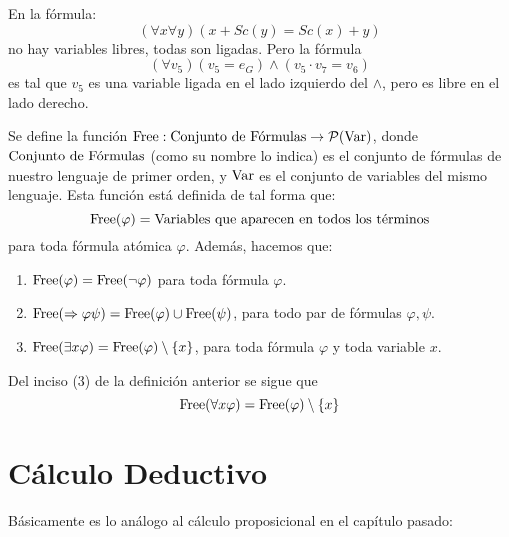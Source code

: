 \documentclass[12pt]{report}
\newcounter{it}
\theoremstyle{largebreak}
\newcommand\cf[3]{\ensuremath{#1:#2\rightarrow#3}}
\newcommand{\free}{\textup{Free}}
\begin{document}
    En la fórmula:
    \begin{equation*}
        (\forall x\forall y)(x+Sc(y)=Sc(x)+y)
    \end{equation*}
    no hay variables libres, todas son ligadas. Pero la fórmula
    \begin{equation*}
        (\forall v_5)(v_5=e_G)\land(v_5\cdot v_7=v_6)
    \end{equation*}
    es tal que $v_5$ es una variable ligada en el lado izquierdo del $\land$, pero es libre en el lado derecho.

    \begin{mydef}
        Se define la función $\cf{\free}{\textup{Conjunto de Fórmulas}}{\mathcal{P}(\textup{Var})}$, donde $\textup{Conjunto de Fórmulas}$ (como su nombre lo indica) es el conjunto de fórmulas de nuestro lenguaje de primer orden, y $\textup{Var}$ es el conjunto de variables del mismo lenguaje. Esta función está definida de tal forma que:
        \begin{equation*}
            \free(\varphi)=\textup{Variables que aparecen en todos los términos}
        \end{equation*}
        para toda fórmula atómica $\varphi$. Además, hacemos que:
        \begin{enumerate}
            \item $\free(\varphi)=\free(\neg\varphi)$ para toda fórmula $\varphi$.
            \item $\free(\Rightarrow\varphi\psi)=\free(\varphi)\cup\free(\psi)$, para todo par de fórmulas $\varphi,\psi$.
            \item $\free(\exists x\varphi)=\free(\varphi)\setminus\left\{x\right\}$, para toda fórmula $\varphi$ y toda variable $x$.
        \end{enumerate}
    \end{mydef}

    \begin{obs}
        Del inciso (3) de la definición anterior se sigue que
        \begin{equation*}
            \free(\forall x\varphi)=\free(\varphi)\setminus\left\{x\right\}
        \end{equation*}
    \end{obs}

    \section{Cálculo Deductivo}

    Básicamente es lo análogo al cálculo proposicional en el capítulo pasado:
\end{document}
